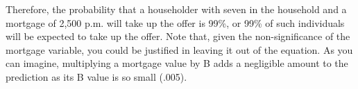 \documentclass[a4paper,12pt]{article}
\begin{document}
Therefore, the probability that a householder with seven in the household and a mortgage of 2,500 p.m. will take up the offer is 99\%, or 99\% of such individuals will be
expected to take up the offer.
Note that, given the non-significance of the mortgage variable, you could be justified
in leaving it out of the equation. As you can imagine, multiplying a mortgage value by
B adds a negligible amount to the prediction as its B value is so small (.005).
\end{document}
